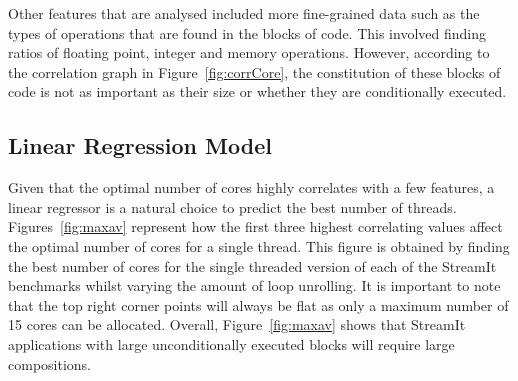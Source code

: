 Other features that are analysed included more fine-grained data such as the types of operations that are found in the blocks of code.
This involved finding ratios of floating point, integer and memory operations.
However, according to the correlation graph in Figure~\ref{fig:corrCore}, the constitution of these blocks of code is not as important as their size or whether they are conditionally executed.


\subsection{Linear Regression Model}
Given that the optimal number of cores highly correlates with a few features, a linear regressor is a natural choice to predict the best number of threads.
Figures~\ref{fig:maxav} represent how the first three highest correlating values affect the optimal number of cores for a single thread.
This figure is obtained by finding the best number of cores for the single threaded version of each of the StreamIt benchmarks whilst varying the amount of loop unrolling.
It is important to note that the top right corner points will always be flat as only a maximum number of 15 cores can be allocated.
Overall, Figure~\ref{fig:maxav} shows that StreamIt applications with large unconditionally executed blocks will require large compositions.


